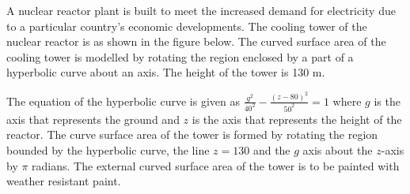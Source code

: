 \begin{problem}
    A nuclear reactor plant is built to meet the increased demand for electricity due to a particular country's economic developments. The cooling tower of the nuclear reactor is as shown in the figure below. The curved surface area of the cooling tower is modelled by rotating the region enclosed by a part of a hyperbolic curve about an axis. The height of the tower is 130 m.

    \begin{center}
    \end{center}

    The equation of the hyperbolic curve is given as $\frac{g^2}{40^2} - \frac{(z-80)^2}{50^2} = 1$ where $g$ is the axis that represents the ground and $z$ is the axis that represents the height of the reactor. The curve surface area of the tower is formed by rotating the region bounded by the hyperbolic curve, the line $z = 130$ and the $g$ axis about the $z$-axis by $\pi$ radians. The external curved surface area of the tower is to be painted with weather resistant paint.


\end{problem}
